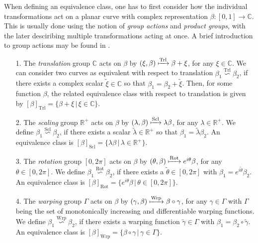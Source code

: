 When defining an equivalence class, one has to first consider how the individual transformations act on a planar curve with complex representation $\beta : [0,1] \rightarrow \mathbb{C}$.
This is usually done using the notion of \textit{group actions} and \textit{product groups}, with the later desciribing multiple transformations acting at once.
A brief introduction to group actions may be found in \cite[Chap.\ 3]{SrivastavaKlassen2016}.

\begin{itemize}[leftmargin=0.75cm]
  \item[1.] The \emph{translation} group $\mathbb{C}$ acts on $\beta$ by $(\xi, \beta) \xmapsto{\text{Trl}} \beta + \xi$, for any $\xi \in \mathbb{C}$.
    We can consider two curves as equivalent with respect to translation $\beta_1 \overset{\text{Trl}}{\backsim} \beta_2$, if there exists a complex scalar $\widetilde\xi \in \mathbb{C}$ so that $\beta_1 = \beta_2  + \widetilde\xi$.
    Then, for some function $\beta$, the related equivalence class with respect to translation is given by $[\beta]_{\text{Trl}} = \{\beta + \xi\, |\, \xi \in \mathbb{C}\}$.
  \item[2.] The \emph{scaling} group $\mathbb{R}^+$ acts on $\beta$ by $(\lambda, \beta) \xmapsto{\text{Scl}} \lambda \beta$, for any $\lambda \in \mathbb{R}^+$.
    We define $\beta_1 \overset{\text{Scl}}{\backsim} \beta_2$, if there exists a scalar $\widetilde\lambda \in \mathbb{R}^+$ so that $\beta_1 = \widetilde\lambda \beta_2$.
    An equivalence class is $[\beta]_{\text{Scl}} = \{\lambda\beta\,|\, \lambda \in \mathbb{R}^+\}$.
  \item[3.] The \emph{rotation} group $[0,2\pi]$ acts on $\beta$ by $(\theta, \beta) \xmapsto{\text{Rot}}  e^{i\theta} \beta$, for any $\theta \in [0,2\pi]$.
    We define $\beta_1 \overset{\text{Rot}}{\backsim} \beta_2$, if there exists a $\widetilde\theta \in [0,2\pi]$ with $\beta_1 = e^{i\widetilde\theta} \beta_2$.
    An equivalence class is $[\beta]_{\text{Rot}} = \{e^{i\theta}\beta\,|\, \theta \in [0,2\pi]\}$.
  \item[4.] The \emph{warping} group $\Gamma$ acts on $\beta$ by $(\gamma,\beta) \xmapsto{\text{Wrp}} \beta \circ \gamma$, for any $\gamma \in \Gamma$ with $\Gamma$ being the set of monotonically increasing and differentiable warping functions.
    We define $\beta_1 \overset{\text{Wrp}}{\backsim} \beta_2$, if there exists a warping function $\widetilde\gamma \in \Gamma$ with $\beta_1 = \beta_2 \circ \widetilde\gamma$.
    An equivalence class is $[\beta]_{\text{Wrp}} = \{\beta \circ \gamma\,|\, \gamma \in \Gamma\}$.
\end{itemize}

